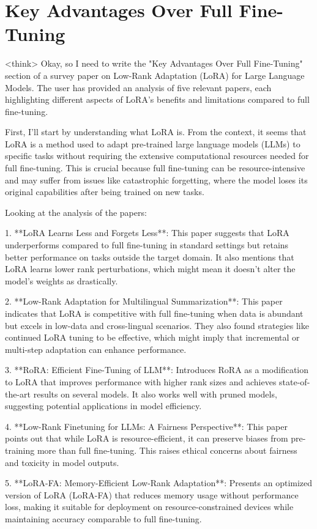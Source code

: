 \documentclass[conference]{IEEEtran}
\begin{document}
\section{Key Advantages Over Full Fine-Tuning}
<think>
Okay, so I need to write the "Key Advantages Over Full Fine-Tuning" section of a survey paper on Low-Rank Adaptation (LoRA) for Large Language Models. The user has provided an analysis of five relevant papers, each highlighting different aspects of LoRA's benefits and limitations compared to full fine-tuning.

First, I'll start by understanding what LoRA is. From the context, it seems that LoRA is a method used to adapt pre-trained large language models (LLMs) to specific tasks without requiring the extensive computational resources needed for full fine-tuning. This is crucial because full fine-tuning can be resource-intensive and may suffer from issues like catastrophic forgetting, where the model loses its original capabilities after being trained on new tasks.

Looking at the analysis of the papers:

1. **LoRA Learns Less and Forgets Less**: This paper suggests that LoRA underperforms compared to full fine-tuning in standard settings but retains better performance on tasks outside the target domain. It also mentions that LoRA learns lower rank perturbations, which might mean it doesn't alter the model's weights as drastically.

2. **Low-Rank Adaptation for Multilingual Summarization**: This paper indicates that LoRA is competitive with full fine-tuning when data is abundant but excels in low-data and cross-lingual scenarios. They also found strategies like continued LoRA tuning to be effective, which might imply that incremental or multi-step adaptation can enhance performance.

3. **RoRA: Efficient Fine-Tuning of LLM**: Introduces RoRA as a modification to LoRA that improves performance with higher rank sizes and achieves state-of-the-art results on several models. It also works well with pruned models, suggesting potential applications in model efficiency.

4. **Low-Rank Finetuning for LLMs: A Fairness Perspective**: This paper points out that while LoRA is resource-efficient, it can preserve biases from pre-training more than full fine-tuning. This raises ethical concerns about fairness and toxicity in model outputs.

5. **LoRA-FA: Memory-Efficient Low-Rank Adaptation**: Presents an optimized version of LoRA (LoRA-FA) that reduces memory usage without performance loss, making it suitable for deployment on resource-constrained devices while maintaining accuracy comparable to full fine-tuning.
\end{document}
